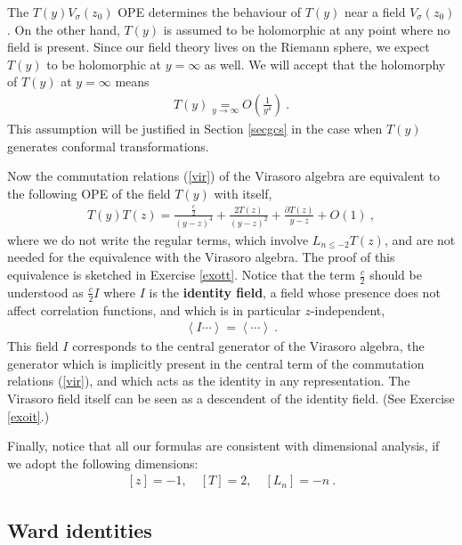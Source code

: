 \documentclass[12pt,a4paper,notitlepage]{report}
\newcommand \la {\left\langle}
\newcommand \ra {\right\rangle}
\newcommand \p {\partial}
\numberwithin{equation}{section}
\theoremstyle{break}
\begin{document}
The $T(y)V_\sigma(z_0)$ OPE determines  the behaviour of $T(y)$ near a field $V_\sigma(z_0)$. On the other hand, $T(y)$ is assumed to be holomorphic at any point where no field is present. Since our field theory lives on the Riemann sphere, we expect $T(y)$ to be holomorphic at $y=\infty$ as well. We will accept that the holomorphy of $T(y)$ at $y=\infty$ means
\begin{align}
 \boxed{T(y) \underset{y\rightarrow \infty}{=} O\left(\frac{1}{y^4}\right)}\ .
\label{tyi}
\end{align}
This assumption will be justified in Section \ref{secgcs} in the case when $T(y)$ generates conformal transformations.

Now the commutation relations (\ref{vir}) of the Virasoro algebra are equivalent to the following OPE of the field $T(y)$ with itself,
\begin{align}
 \boxed{T(y)T(z) = \frac{\frac{c}{2}}{(y-z)^4} + \frac{2T(z)}{(y-z)^2} + \frac{\p T(z)}{y-z} + O(1)}\ ,
\label{tt}
\end{align}
where we do not write the regular terms, which involve $L_{n\leq -2} T(z)$, and are not needed for the equivalence with the Virasoro algebra. The proof of this equivalence is sketched in Exercise \ref{exott}. Notice that the term $\frac{c}{2}$ should be understood as $\frac{c}{2}I$ where $I$ is the \textbf{\boldmath identity field}, a field whose presence does not affect correlation functions, and which is in particular $z$-independent,
\begin{align}
 \la I \cdots \ra = \la \cdots \ra \ .
\label{ivac}
\end{align}
This field $I$ corresponds to the central generator of the Virasoro algebra, the generator which is implicitly present in the central term of the commutation relations (\ref{vir}), and which acts as the identity in any representation. The Virasoro field itself can be seen as a descendent of the identity field. (See Exercise \ref{exoit}.)

Finally, notice that all our formulas are consistent with dimensional analysis, if we adopt the following dimensions:
\begin{align}
 \boxed{[z]=-1,\quad [T]=2, \quad [L_n]=-n}\ .
\label{zaz}
\end{align}


\subsection{Ward identities \label{secswi}}
\end{document}
